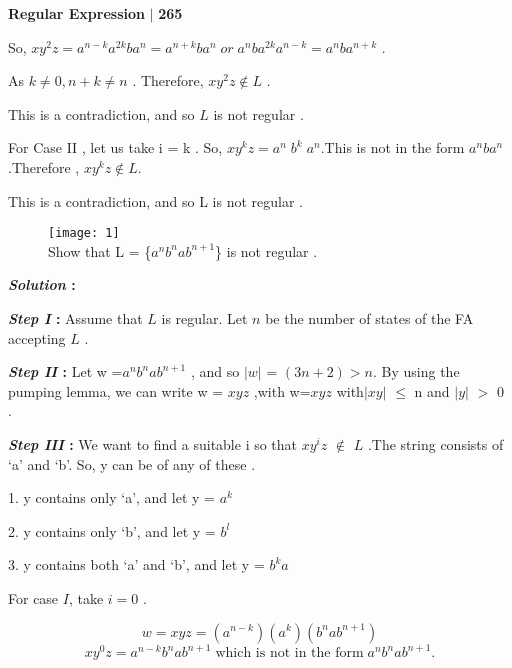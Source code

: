 \documentclass[10pt,a4paper]{book}
\begin{document}
\small

\begin{flushright}
  \textsf{\textbf{Regular Expression}} $|$ \textbf{\textsf{265}}
\end{flushright}

\begin{flushleft}
  So, $xy^{2}z = a^{n-k} a^{2k}b a^n = a^{n+k}b a^n \;or\;  a^n b a^{2k} a^{n-k}  = a^n b a^{n+k}$ .

As $k \neq 0 , n+k \neq n$ . Therefore, $xy^{2}z  \notin  L$ .

This is a contradiction, and so $L$ is not regular .

For Case II , let us take i = k . So, $xy^{k}z = a^{n}\; b^{k}\; a^{n}$.This is not in the form $a^{n} b a^{n}$.Therefore , $x y^k z \notin L$.

This is a contradiction, and so L is not regular .
\end{flushleft}

\begin{flushleft}
\begin{figure}[h]
  \texttt{[image: 1]}\\Show that L = \{$a^n b^n a b^{n+1}$\} is not regular .
\end{figure}
\end{flushleft}

\begin{flushleft}
  \textbf{\emph{Solution} :}

\textbf{\emph{Step I} :} Assume that $L$ is regular. Let $n$ be the number of states of the FA accepting $L$ .

\textbf{\emph{Step II} :} Let w =$a^n b^n a b^{n+1}$ , and so $| w |$ = $(3n + 2) > n$. By using the pumping lemma, we can write w = $xyz$ ,with w=$xyz$ with$|xy|$ $\leq$ n and $|y|$ $>$ 0 .

\textbf{\emph{Step III} :} We want to find a suitable i so that $xy^{i}z$ $\notin$ $L$ .The string consists of ‘a’ and ‘b’. So, y can be of any of these .

\end{flushleft}

1. y contains only ‘a’, and let y = $a^k$

2. y contains only ‘b’, and let y = $b^l$

3. y contains both ‘a’ and ‘b’, and let y = $b^{k}a$

For case $I$, take $i = 0$ .

$$ w = xyz = (a^{n-k})(a^k)(b^{n} a b^{n+1})$$
$$ xy^{0}z = a^{n-k} b^{n} ab^{n+1}\; \textrm{which is not in the form}\; a^{n} b^{n} ab^{n+1} .  $$
\end{document}
